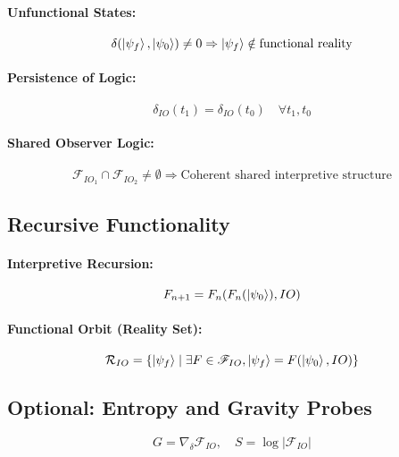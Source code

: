\documentclass[12pt]{article}
\begin{document}
\paragraph{Unfunctional States:}
\begin{equation}
\delta(\ket{\psi_f}, \ket{\psi_0}) \neq 0 \Rightarrow \ket{\psi_f} \notin \text{functional reality}
\end{equation}

\paragraph{Persistence of Logic:}
\begin{equation}
\delta_{IO}(t_1) = \delta_{IO}(t_0) \quad \forall t_1, t_0
\end{equation}

\paragraph{Shared Observer Logic:}
\begin{equation}
\mathscr{F}_{IO_1} \cap \mathscr{F}_{IO_2} \neq \emptyset \Rightarrow \text{Coherent shared interpretive structure}
\end{equation}

\subsection{Recursive Functionality}

\paragraph{Interpretive Recursion:}
\begin{equation}
F_{n+1} = F_n(F_n(\ket{\psi_0}), IO)
\end{equation}

\paragraph{Functional Orbit (Reality Set):}
\begin{equation}
\mathcal{R}_{IO} = \left\{ \ket{\psi_f} \mid \exists F \in \mathscr{F}_{IO}, \ket{\psi_f} = F(\ket{\psi_0}, IO) \right\}
\end{equation}

\subsection{Optional: Entropy and Gravity Probes}
\begin{equation}
G = \nabla_{\delta} \mathscr{F}_{IO}, \quad S = \log \left| \mathscr{F}_{IO} \right|
\end{equation}
\end{document}

